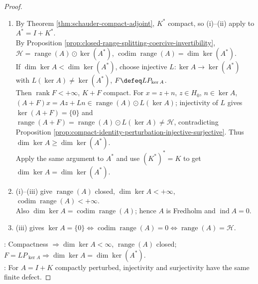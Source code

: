 \begin{theorem}
\begin{proof}
\begin{enumerate}[label=(\roman*)]
Thus $h\in\ker A\cap H_0=\{0\}$, contradiction. Hence $\exists c>0:\norm{Ah}\geq c\norm{h}$ on $H_0$.\\
Also $A(H_0)=A(\mathcal{H})$. If $Ah_n\to y$ with $h_n\in H_0$, then $\norm{h_n-h_m}\leq c^{-1}\norm{Ah_n-Ah_m}$.\\
Thus $h_n\to h\in H_0$ and $Ah=y$; hence $\operatorname{range}(A)$ is closed.
\item By Theorem \ref{thm:schauder-compact-adjoint}, $K^*$ compact, so (i)--(ii) apply to $A^*=I+K^*$.\\
By Proposition \ref{prop:closed-range-splitting-coercive-invertibility}, $\mathcal{H}=\operatorname{range}(A)\odot\ker(A^*)$, $\operatorname{codim}\operatorname{range}(A)=\dim\ker(A^*)$.\\
If $\dim\ker A<\dim\ker(A^*)$, choose injective $L:\ker A\to\ker(A^*)$ with $L(\ker A)\neq\ker(A^*)$, $F\defeq LP_{\ker A}$.\\
Then $\operatorname{rank}F<+\infty$, $K+F$ compact. For $x=z+n$, $z\in H_0$, $n\in\ker A$,\\
$(A+F)x=Az+Ln\in\operatorname{range}(A)\odot L(\ker A)$; injectivity of $L$ gives $\ker(A+F)=\{0\}$ and\\
$\operatorname{range}(A+F)=\operatorname{range}(A)\odot L(\ker A)\neq\mathcal{H}$, contradicting Proposition \ref{prop:compact-identity-perturbation-injective-surjective}. Thus $\dim\ker A\geq\dim\ker(A^*)$.\\
Apply the same argument to $A^*$ and use $(K^*)^*=K$ to get $\dim\ker A=\dim\ker(A^*)$.
\item (i)--(iii) give $\operatorname{range}(A)$ closed, $\dim\ker A<+\infty$, $\operatorname{codim}\operatorname{range}(A)<+\infty$.\\
Also $\dim\ker A=\operatorname{codim}\operatorname{range}(A)$; hence $A$ is Fredholm and $\operatorname{ind}A=0$.
\item (iii) gives $\ker A=\{0\}\Longleftrightarrow\operatorname{codim}\operatorname{range}(A)=0\Longleftrightarrow\operatorname{range}(A)=\mathcal{H}$.
\end{enumerate}
: Compactness $\Rightarrow\dim\ker A<\infty$, $\operatorname{range}(A)$ closed; $F=LP_{\ker A}\Rightarrow\dim\ker A=\dim\ker(A^*)$.\\
: For $A=I+K$ compactly perturbed, injectivity and surjectivity have the same finite defect.
\end{proof}
\end{theorem}

